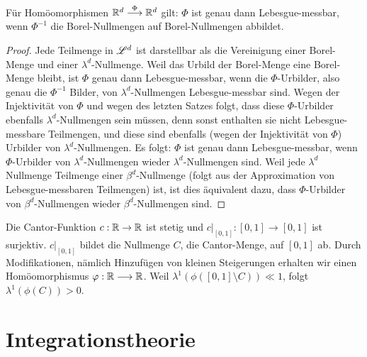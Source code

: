 \begin{satz}
\begin{mdframed}
Für Homöomorphismen $\mathbb{R}^d \overset\Phi\longrightarrow \mathbb{R}^d$ gilt: $\Phi$ ist genau dann Lebesgue-messbar, wenn $\Phi^{-1}$ die Borel-Nullmengen auf Borel-Nullmengen abbildet.
\end{mdframed}
\begin{proof}
Jede Teilmenge in $\mathscr{L}^d$ ist darstellbar als die Vereinigung einer Borel-Menge und einer $\lambda^d$-Nullmenge. Weil das Urbild der Borel-Menge eine Borel-Menge bleibt, ist $\Phi$ genau dann Lebesgue-messbar, wenn die $\Phi$-Urbilder, also genau die $\Phi^{-1}$ Bilder, von $\lambda^d$-Nullmengen Lebesgue-messbar sind. Wegen der Injektivität von $\Phi$ und wegen des letzten Satzes folgt, dass diese $\Phi$-Urbilder ebenfalls $\lambda^d$-Nullmengen sein müssen, denn sonst enthalten sie nicht Lebesgue-messbare Teilmengen, und diese sind ebenfalls (wegen der Injektivität von $\Phi$) Urbilder von $\lambda^d$-Nullmengen. Es folgt: $\Phi$ ist genau dann Lebesgue-messbar, wenn $\Phi$-Urbilder  von $\lambda^d$-Nullmengen  wieder $\lambda^d$-Nullmengen sind. Weil jede $\lambda^d$ Nullmenge Teilmenge einer $\beta^d$-Nullmenge (folgt aus der Approximation von Lebesgue-messbaren Teilmengen) ist, ist dies äquivalent dazu, dass $\Phi$-Urbilder von $\beta^d$-Nullmengen wieder $\beta^d$-Nullmengen sind.
\end{proof}
\end{satz}

\begin{example}[$d=1$, die Cantor-Funktion] Die Cantor-Funktion $c:\mathbb{R}\to \mathbb{R}$ ist stetig und $c|_{[0,1]}:[0,1]\longrightarrow[0,1]$ ist surjektiv. $c|_{[0,1]}$ bildet die Nullmenge $C$, die Cantor-Menge, auf $[0,1]$ ab. Durch Modifikationen, nämlich Hinzufügen von kleinen Steigerungen erhalten wir einen Homöomorphismus $\varphi:\mathbb{R}\longrightarrow\mathbb{R}$. Weil $\lambda^1(\phi([0,1]\setminus C)) \ll 1$, folgt $\lambda^1(\phi(C))>0$. 
\end{example}

\section{Integrationstheorie}
